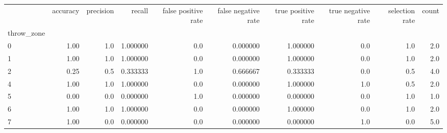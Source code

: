 \begin{tabular}{lrrrrrrrrr}
\toprule
{} &  accuracy &  precision &    recall &  false positive rate &  false negative rate &  true positive rate &  true negative rate &  selection rate &  count \\
throw\_zone &           &            &           &                      &                      &                     &                     &                 &        \\
\midrule
0          &      1.00 &        1.0 &  1.000000 &                  0.0 &             0.000000 &            1.000000 &                 0.0 &             1.0 &    2.0 \\
1          &      1.00 &        1.0 &  1.000000 &                  0.0 &             0.000000 &            1.000000 &                 0.0 &             1.0 &    2.0 \\
2          &      0.25 &        0.5 &  0.333333 &                  1.0 &             0.666667 &            0.333333 &                 0.0 &             0.5 &    4.0 \\
4          &      1.00 &        1.0 &  1.000000 &                  0.0 &             0.000000 &            1.000000 &                 1.0 &             0.5 &    2.0 \\
5          &      0.00 &        0.0 &  0.000000 &                  1.0 &             0.000000 &            0.000000 &                 0.0 &             1.0 &    1.0 \\
6          &      1.00 &        1.0 &  1.000000 &                  0.0 &             0.000000 &            1.000000 &                 0.0 &             1.0 &    2.0 \\
7          &      1.00 &        0.0 &  0.000000 &                  0.0 &             0.000000 &            0.000000 &                 1.0 &             0.0 &    5.0 \\
\bottomrule
\end{tabular}
